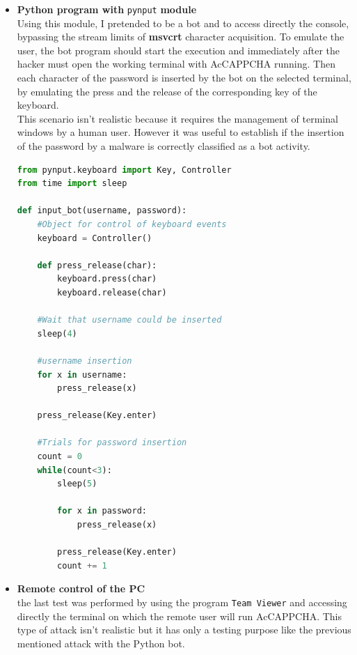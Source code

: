 \begin{itemize}
{\begin{lstlisting}[language=python, showstringspaces=false, tabsize=4, basicstyle=\footnotesize, caption={\footnotesize{Bot using popen.}},label={Results:popen_bot}]
    #Wait until username could be inserted
    sleep(4)
    #Write username and password
    credentials = username.encode() + b'\r\n' + \
    			  password.encode() + b'\r\n'
    output = process.communicate(credentials)[0]
    
    print(output.decode())
\end{lstlisting}
}
\item{\textbf{Python program with} \texttt{pynput} \textbf{module}\\
Using this module, I pretended to be a bot and to access directly the console, bypassing the stream limits of \textbf{msvcrt} character acquisition. To emulate the user, the bot program should start the execution and immediately after the hacker must open the working terminal with AcCAPPCHA running. Then each character of the password is inserted by the bot on the selected terminal, by emulating the press and the release of the corresponding key of the keyboard.\\
This scenario isn't realistic because it requires the management of terminal windows by a human user. However it was useful to establish if the insertion of the password by a malware is correctly classified as a bot activity.
\begin{lstlisting}[language=python, showstringspaces=false, tabsize=4, basicstyle=\footnotesize, caption={\footnotesize{Bot using pynput module.}},label={Results:pynput_bot}]
from pynput.keyboard import Key, Controller
from time import sleep

def input_bot(username, password):
    #Object for control of keyboard events
    keyboard = Controller()

    def press_release(char):
        keyboard.press(char)
        keyboard.release(char)

    #Wait that username could be inserted
    sleep(4)

    #username insertion
    for x in username:
        press_release(x)
    
    press_release(Key.enter)

    #Trials for password insertion
    count = 0
    while(count<3):
        sleep(5)
        
        for x in password:
            press_release(x)

        press_release(Key.enter)
        count += 1
\end{lstlisting}
}
\item{\textbf{Remote control of the PC}\\
the last test was performed by using the program \texttt{Team Viewer} and accessing directly the terminal on which the remote user will run AcCAPPCHA. This type of attack isn't realistic but it has only a testing purpose like the previous mentioned attack with the Python bot.}
\end{itemize}
